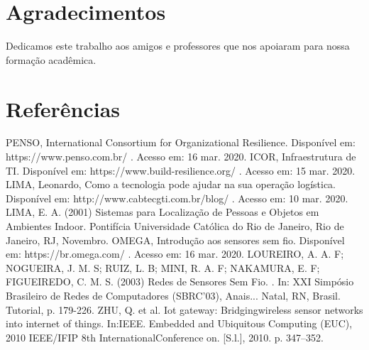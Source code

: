 \documentclass[
	article,			%
	12pt,				%
	oneside,			%
	a4paper,			%
	english,			%
	brazil,				%
	sumario=tradicional
	]{abntex2}
\begin{document}
\section*{Agradecimentos}

Dedicamos este trabalho aos amigos e professores que nos apoiaram para nossa formação acadêmica.

\section*{Referências}
PENSO, International Consortium for Organizational Resilience. Disponível em: https://www.penso.com.br/ . Acesso em: 16 mar. 2020.
\newline
ICOR, Infraestrutura de TI. Disponível em: https://www.build-resilience.org/ . Acesso em: 15 mar. 2020.
\newline
LIMA, Leonardo, Como a tecnologia pode ajudar na sua operação logística. Disponível em: http://www.cabtecgti.com.br/blog/ . Acesso em: 10 mar. 2020.
\newline
LIMA, E. A. (2001) Sistemas para Localização de Pessoas e Objetos em Ambientes
\newline
Indoor. Pontifícia Universidade Católica do Rio de Janeiro, Rio de Janeiro, RJ, Novembro.
\newline
OMEGA, Introdução aos sensores sem fio. Disponível em: https://br.omega.com/ . Acesso em: 16 mar. 2020.
\newline
LOUREIRO, A. A. F; NOGUEIRA, J. M. S; RUIZ, L. B; MINI, R. A. F; NAKAMURA, E. F; FIGUEIREDO, C. M. S. (2003) Redes de Sensores Sem Fio. . In: XXI Simpósio Brasileiro de Redes de Computadores (SBRC'03), Anais... Natal, RN, Brasil. Tutorial, p. 179-226.
\newline
ZHU, Q. et al. Iot gateway: Bridgingwireless sensor networks into internet of things. In:IEEE. Embedded and Ubiquitous Computing (EUC), 2010 IEEE/IFIP 8th InternationalConference on. [S.l.], 2010. p. 347–352.
\end{document}
